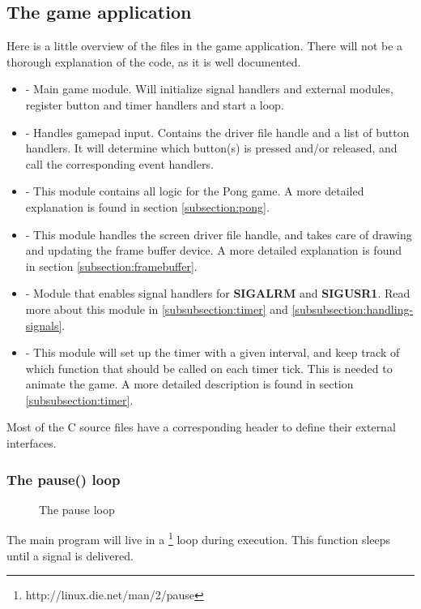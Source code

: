 \subsection{The game application}
\label{subsection:the_game_application}
Here is a little overview of the files in the game application. There will not be a thorough explanation of the code, as it is well documented.

\begin{itemize}
	\item {} - Main game module. Will initialize signal handlers and external modules, register button and timer handlers and start a  loop. 
	\item {} - Handles gamepad input. Contains the driver file handle and a list of button handlers. It will determine which button(s) is pressed and/or released, and call the corresponding event handlers.
	\item {} - This module contains all logic for the Pong game. A more detailed explanation is found in section \ref{subsection:pong}.
	\item {} - This module handles the screen driver file handle, and takes care of drawing and updating the frame buffer device. A more detailed explanation is found in section \ref{subsection:framebuffer}.
	\item {} - Module that enables signal handlers for \textbf{SIGALRM} and \textbf{SIGUSR1}. Read more about this module in \ref{subsubsection:timer} and \ref{subsubsection:handling-signals}.
	\item {} - This module will set up the timer with a given interval, and keep track of which function that should be called on each timer tick. This is needed to animate the game. A more detailed description is found in section \ref{subsubsection:timer}.
\end{itemize}

Most of the C source files have a corresponding header to define their external interfaces.

\subsubsection{The pause() loop}
\begin{figure}[h]
	\centering
	
	\caption{The pause loop}
	\label{fig:pause-loop}
\end{figure}
The main program will live in a \footnote{http://linux.die.net/man/2/pause} loop during execution. This function sleeps until a signal is delivered.

